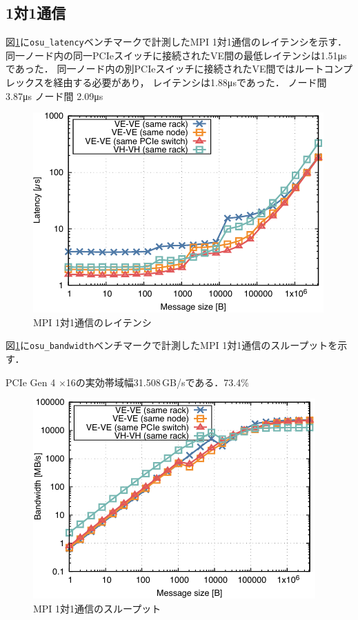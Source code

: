 ﻿\documentclass[submit,techrep,noauthor]{ipsj}
\newcommand{\us}{\si{\micro\second}}
\begin{document}
\subsection{1対1通信}

図\ref{fig:mpi-lat}に\verb|osu_latency|ベンチマークで計測したMPI 1対1通信のレイテンシを示す．
同一ノード内の同一PCIeスイッチに接続されたVE間の最低レイテンシは1.51\us であった．
同一ノード内の別PCIeスイッチに接続されたVE間ではルートコンプレックスを経由する必要があり，
レイテンシは1.88\us であった．
ノード間 3.87\us
ノード間 2.09\us

\begin{figure}
  \centering
  \includegraphics{figs/mpi_latency.pdf}
  \caption{MPI 1対1通信のレイテンシ}\label{fig:mpi-lat}
\end{figure}

図\ref{fig:mpi-lat}に\verb|osu_bandwidth|ベンチマークで計測したMPI 1対1通信のスループットを示す．

PCIe Gen 4 $\times$16の実効帯域幅31.508\,GB/sである．73.4\%

\begin{figure}
  \centering
  \includegraphics{figs/mpi_bandwidth.pdf}
  \caption{MPI 1対1通信のスループット}\label{fig:bw}
\end{figure}
\end{document}
